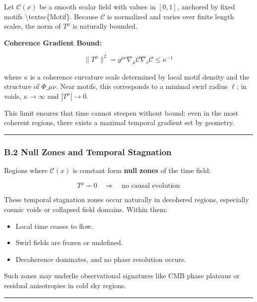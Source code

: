 \documentclass[
  11pt,
]{article}
\providecommand{\tightlist}{%
  \setlength{\itemsep}{0pt}\setlength{\parskip}{0pt}}
\begin{document}
Let \(\mathcal{C}(x)\) be a smooth scalar field with values in
\([0, 1]\), anchored by fixed motifs \textbackslash textsc\{Motif\}.
Because \(\mathcal{C}\) is normalized and varies over finite length
scales, the norm of \(T^\mu\) is naturally bounded.

\textbf{Coherence Gradient Bound:}

\[
\| T^\mu \|^2 = g^{\mu\nu} \nabla_\mu \mathcal{C} \nabla_\nu \mathcal{C} \leq \kappa^{-1}
\]

where \(\kappa\) is a coherence curvature scale determined by local
motif density and the structure of \(\Phi\_{\mu\nu}\). Near motifs, this
corresponds to a minimal swirl radius \(\ell\); in voids,
\(\kappa \to \infty\) and \(|T^\mu| \to 0\).

This limit ensures that time cannot steepen without bound: even in the
most coherent regions, there exists a maximal temporal gradient set by
geometry.

\begin{center}\rule{0.5\linewidth}{0.5pt}\end{center}

\subsubsection{\texorpdfstring{\textbf{B.2 Null Zones and Temporal
Stagnation}}{B.2 Null Zones and Temporal Stagnation}}\label{b.2-null-zones-and-temporal-stagnation}

Regions where \(\mathcal{C}(x)\) is constant form \textbf{null zones} of
the time field:

\[
T^\mu = 0 \quad \Rightarrow \quad \text{no causal evolution}
\]

These temporal stagnation zones occur naturally in decohered regions,
especially cosmic voids or collapsed field domains. Within them:

\begin{itemize}
\tightlist
\item
  Local time ceases to flow.
\item
  Swirl fields are frozen or undefined.
\item
  Decoherence dominates, and no phase resolution occurs.
\end{itemize}

Such zones may underlie observational signatures like CMB phase plateaus
or residual anisotropies in cold sky regions.

\begin{center}\rule{0.5\linewidth}{0.5pt}\end{center}
\end{document}
